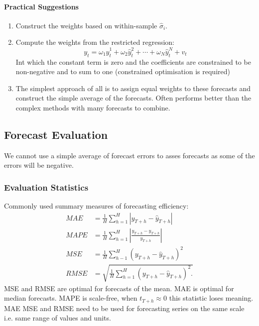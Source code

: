 \documentclass[11pt]{article}
\begin{document}
\paragraph{Practical Suggestions} \mbox{}

\begin{enumerate}
    \item Construct the weights based on within-sample $\hat{\sigma}_i$.
    \item Compute the weights from the restricted regression:
    \begin{equation}
y_t=\omega_1 \widehat{y}_t^1+\omega_2 \widehat{y}_t^2+\cdots+\omega_N \widehat{y}_t^N+v_t
\end{equation}
Int which the constant term is zero and the coefficients are constrained to be non-negative and to sum to one (constrained optimisation is required)

\item The simplest approach of all is to assign equal weights to these forecasts and construct the simple average of the forecasts. Often performs better than the complex methods with many forecasts to combine.
\end{enumerate}

\subsection{Forecast Evaluation}

We cannot use a simple average of forecast errors to asses forecasts as some of the errors will be negative.

\subsubsection{Evaluation Statistics}

\begin{definition}
    Commonly used summary measures of forecasting efficiency:
    \begin{equation}
\begin{aligned}
M A E & =\frac{1}{H} \sum_{h=1}^H\left|y_{T+h}-\widehat{y}_{T+h}\right| \\
M A P E & =\frac{1}{H} \sum_{h=1}^H\left|\frac{y_{T+h}-\widehat{y}_{T+h}}{y_{T+h}}\right| \\
M S E & =\frac{1}{H} \sum_{h-1}^H\left(y_{T+h}-\widehat{y}_{T+h}\right)^2 \\
R M S E & =\sqrt{\frac{1}{H} \sum_{h=1}^H\left(y_{T+h}-\widehat{y}_{T+h}\right)^2 .}
\end{aligned}
\end{equation}
MSE and RMSE are optimal for forecasts of the mean. MAE is optimal for median forecasts. MAPE is scale-free, when $t_{T+h}\approx0$ this statistic loses meaning. MAE MSE and RMSE need to be used for forecasting series on the same scale  i.e. same range of values and units.
\end{definition}
\end{document}
